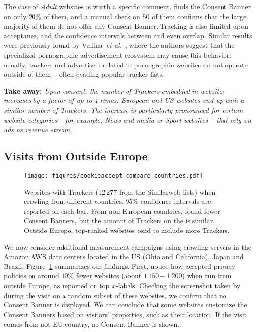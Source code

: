 The case of \textit{Adult} websites is worth a specific comment. \TOOL finds the Consent Banner on only $20\%$ of them, and a manual check on $50$ of them confirms that the large majority of them do not offer any Consent Banner. Tracking is also limited upon acceptance, and the confidence intervals between \BEFORE and \AFTER even overlap. Similar results were previously found by Vallina~\emph{et al.}~\cite{vallina2019tales}, where the authors suggest that the specialized pornographic advertisement ecosystem may cause this behavior: usually, trackers and advertisers related to pornographic websites do not operate outside of them -- often evading popular tracker lists.

\textbf{Take away:} 
\textit{Upon consent, the number of Trackers embedded in websites increases by a factor of up to 4 times. European and US websites end up with a similar number of Trackers. The increase is particularly pronounced for certain website categories -- for example, News and media or Sport websites -- that rely on ads as revenue stream.}

\subsection{Visits from Outside Europe}

\begin{figure}[t]
    \centering
    \texttt{[image: figures/cookieaccept\_compare\_countries.pdf]}
    \caption{Websites with Trackers (12\,277 from the Similarweb lists) when crawling from different countries. 95\% confidence intervals are reported on each bar. From non-European countries, \TOOL found fewer Consent Banners, but the amount of Trackers on the \AFTER is similar. Outside Europe, top-ranked websites tend to include more Trackers.}
    \label{fig:ca_us}
\end{figure}

We now consider additional measurement campaigns using crawling servers in the Amazon AWS data centers located in the US (Ohio and California), Japan and Brazil. Figure~\ref{fig:ca_us} summarizes our findings. First, notice how \TOOL accepted privacy policies on around $10\%$ fewer websites (about $1\,150-1\,200$) when run from outside Europe, as reported on top $x$-labels. 
Checking the screenshot taken by \TOOL during the visit on a random subset of these websites, we confirm that no Consent Banner is displayed. We can conclude that some websites customize the Consent Banners based on visitors' properties, such as their location. If the visit comes from not EU country, no Consent Banner is shown.

